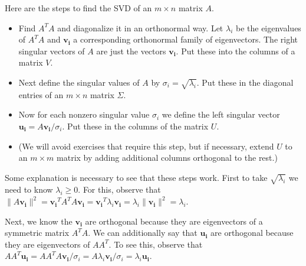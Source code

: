 \documentclass[11pt,oneside]{amsbook}
\theoremstyle{definition}
\theoremstyle{plain}
\theoremstyle{definition}
\theoremstyle{remark}
\numberwithin{equation}{section}
\numberwithin{figure}{section}
\begin{document}
Here are the steps to find the SVD of an $m\times n$ matrix $A$.

\begin{itemize}
  \item Find $A^TA$ and diagonalize it in an orthonormal way. Let $\lambda_i$ be the eigenvalues of $A^TA$ and $\mathbf{v_i}$ a corresponding orthonormal family of eigenvectors. The right singular vectors of $A$ are just the vectors $\mathbf{v_i}$. Put these into the columns of a matrix $V$.
  \item Next define the singular values of $A$ by $\sigma_i=\sqrt{\lambda_i}$. Put these in the diagonal entries of an $m\times n$ matrix $\Sigma$.
  \item Now for each nonzero singular value $\sigma_i$ we define the left singular vector $\mathbf{u_i}=A\mathbf{v_i}/\sigma_i$. Put these in the columns of the matrix $U$.
  \item (We will avoid exercises that require this step, but if necessary, extend $U$ to an $m\times m$ matrix by adding additional columns orthogonal to the rest.)
\end{itemize}

Some explanation is necessary to see that these steps work. First to take $\sqrt{\lambda_i}$ we need to know $\lambda_i\geq0$. For this, observe that $\|A\mathbf{v_i}\|^2=\mathbf{v_i}^TA^TA\mathbf{v_i}=\mathbf{v_i}^T\lambda_i\mathbf{v_i}=\lambda_i\|\mathbf{v_i}\|^2=\lambda_i$.

Next, we know the $\mathbf{v_i}$ are orthogonal because they are eigenvectors of a symmetric matrix $A^TA$. We can additionally say that $\mathbf{u_i}$ are orthogonal because they are eigenvectors of $AA^T$. To see this, observe that $AA^T\mathbf{u_i}=AA^TA\mathbf{v_i}/\sigma_i=A\lambda_i\mathbf{v_i}/\sigma_i=\lambda_i\mathbf{u_i}$.
\end{document}
